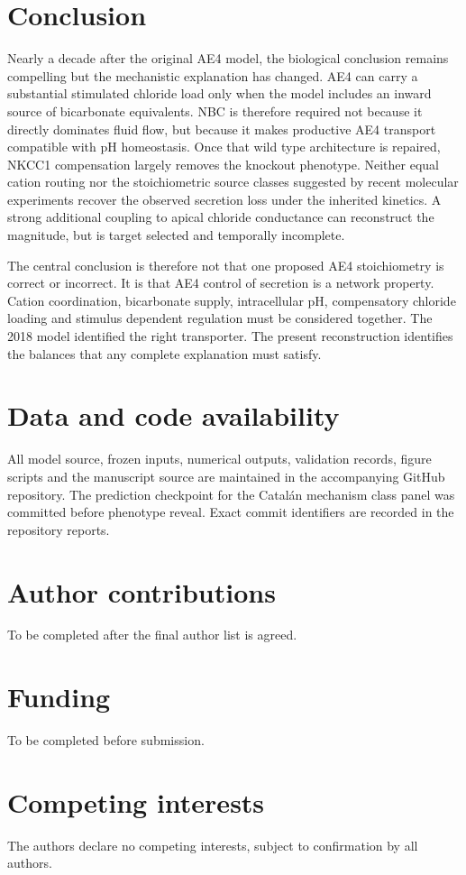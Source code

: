 \section{Conclusion}
\label{sec:conclusion}

Nearly a decade after the original AE4 model, the biological conclusion remains compelling but the mechanistic explanation has changed. AE4 can carry a substantial stimulated chloride load only when the model includes an inward source of bicarbonate equivalents. NBC is therefore required not because it directly dominates fluid flow, but because it makes productive AE4 transport compatible with pH homeostasis. Once that wild type architecture is repaired, NKCC1 compensation largely removes the knockout phenotype. Neither equal cation routing nor the stoichiometric source classes suggested by recent molecular experiments recover the observed secretion loss under the inherited kinetics. A strong additional coupling to apical chloride conductance can reconstruct the magnitude, but is target selected and temporally incomplete.

The central conclusion is therefore not that one proposed AE4 stoichiometry is correct or incorrect. It is that AE4 control of secretion is a network property. Cation coordination, bicarbonate supply, intracellular pH, compensatory chloride loading and stimulus dependent regulation must be considered together. The 2018 model identified the right transporter. The present reconstruction identifies the balances that any complete explanation must satisfy.

\section*{Data and code availability}
All model source, frozen inputs, numerical outputs, validation records, figure scripts and the manuscript source are maintained in the accompanying GitHub repository. The prediction checkpoint for the Catalán mechanism class panel was committed before phenotype reveal. Exact commit identifiers are recorded in the repository reports.

\section*{Author contributions}
To be completed after the final author list is agreed.

\section*{Funding}
To be completed before submission.

\section*{Competing interests}
The authors declare no competing interests, subject to confirmation by all authors.



